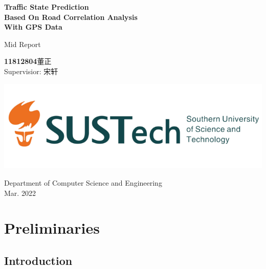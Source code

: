 \documentclass[fontset=none]{ctexart}
\theoremstyle{definition}
\theoremstyle{remark}
\begin{document}
\begin{titlepage}
    \begin{center}
        \vspace*{1cm}
            
        \Huge
        \textbf{Traffic State Prediction\\Based On Road Correlation Analysis\\With GPS Data}
            
        \vspace{0.5cm}
        \LARGE
        Mid Report\\
            
        \vspace{1.5cm}
            
        \textbf{11812804}\quad 董正\\

        \vspace{0.5cm}
        Supervisior: 宋轩
            
        \vfill
            
        \includegraphics[width=\textwidth]{images/sustc.png}
            
        \vspace{0.2cm}
            
        \Large
        Department of Computer Science and Engineering\\
        \vspace{0.5cm}
        Mar. 2022
            
    \end{center}
\end{titlepage}

\tableofcontents

\clearpage
\section{Preliminaries}
\subsection{Introduction}
\end{document}

